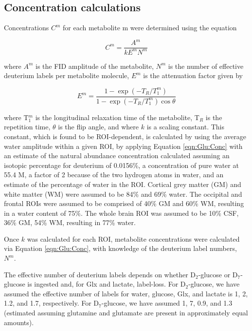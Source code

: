 \documentclass[class=article, crop=false]{standalone}
\begin{document}

\subsection{Concentration calculations}

Concentrations $C^m$ for each metabolite m were determined using the equation

\begin{equation}
    C^m = \frac{A^m}{kE^mN^m}
    \label{eqn:Glu:Conc}
\end{equation}

where $A^m$ is the FID amplitude of the metabolite, $N^m$ is the number of effective deuterium labels per metabolite molecule, $E^m$ is the attenuation factor given by

\begin{equation}
    E^m = \frac{1-\exp(-T_R/T_1^m)}{1-\exp(-T_R/T_1^m)\cos{\theta}}
    \label{eqn:Glu:Atte}
\end{equation}

where T$_1^m$ is the longitudinal relaxation time of the metabolite, T$_R$ is the repetition time, $\theta$ is the flip angle, and where $k$ is a scaling constant. This constant, which is found to be ROI-dependent, is calculated by using the average water amplitude within a given ROI, by applying Equation \ref{eqn:Glu:Conc} with an estimate of the natural abundance concentration calculated assuming an isotopic percentage for deuterium of 0.0156\%\cite{Hagemann1970AbsoluteSMOW}, a concentration of pure water at 55.4 M, a factor of 2 because of the two hydrogen atoms in water, and an estimate of the percentage of water in the ROI. Cortical grey matter (GM) and white matter (WM) were assumed to be 84\% and 69\% water\cite{Oros-Peusquens2019AImplications}. The occipital and frontal ROIs were assumed to be comprised of 40\% GM and 60\% WM, resulting in a water content of 75\%. The whole brain ROI was assumed to be 10\% CSF, 36\% GM, 54\% WM, resulting in 77\% water.

Once $k$ was calculated for each ROI, metabolite concentrations were calculated via Equation \ref{eqn:Glu:Conc}, with knowledge of the deuterium label numbers, $N^m$.

The effective number of deuterium labels depends on whether D$_2$-glucose or D$_7$-glucose is ingested and, for Glx and lactate, label-loss. For D$_2$-glucose, we have assumed the effective number of labels for water, glucose, Glx, and lactate is 1, 2, 1.2, and 1.7, respectively\cite{DeGraaf2021CharacterizationStudies}. For D$_7$-glucose, we have assumed 1, 7, 0.9, and 1.3 (estimated\cite{Funk2017TheGlucose} assuming glutamine and glutamate are present in approximately equal amounts). 
\end{document}
